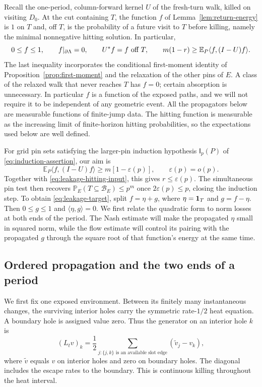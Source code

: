 Recall the one-period, column-forward kernel $U$ of the fresh-turn walk,
killed on visiting $D_0$.  At the cut containing $T$, the function $f$
of Lemma~\ref{lem:return-energy} is $1$ on $T$ and, off $T$, is the
probability of a future visit to $T$ before killing, namely the minimal
nonnegative hitting solution.
In particular,
\begin{equation}\label{eq:leakage-hitting-input}
 0\le f\le1,\qquad f|_{\partial\Lambda}=0,\qquad
 U^*f=f\ \hbox{off }T,\qquad
 m(1-r)\ge\mathbb E_P\langle f,(I-U)f\rangle.
\end{equation}
The last inequality incorporates the conditional first-moment identity
of Proposition~\ref{prop:first-moment} and the relaxation of the other
pins of $E$.  A class of the relaxed walk that never reaches $T$ has
$f=0$; certain absorption is unnecessary.  In particular $f$ is a
function of the exposed paths, and we will not require it to be
independent of any geometric event.
All the propagators below are measurable functions of finite-jump
data.  The hitting function is measurable as the increasing limit of
finite-horizon hitting probabilities, so the expectations used below
are well defined.

For grid pin sets satisfying the larger-pin induction hypothesis
$\mathsf I_p(P)$ of \eqref{eq:induction-assertion}, our aim is
\begin{equation}\label{eq:leakage-target}
 \mathbb E_P\langle f,(I-U)f\rangle\ge m[1-\varepsilon(p)],
 \qquad \varepsilon(p)=o(p).
\end{equation}
Together with \eqref{eq:leakage-hitting-input}, this gives
$r\le\varepsilon(p)$.  The simultaneous pin test then recovers
$\mathbb P_E(T\subseteq\mathcal B_E)\le p^m$ once
$2\varepsilon(p)\le p$, closing the induction step.
To obtain \eqref{eq:leakage-target}, split
$f=\eta+g$, where $\eta=\mathbf 1_T$ and $g=f-\eta$.
Then $0\le g\le1$ and $\langle\eta,g\rangle=0$.
We first relate the quadratic form to norm losses at both ends of the
period.  The Nash estimate will make the propagated $\eta$ small in
squared norm, while the flow estimate will control its pairing with the
propagated $g$ through the square root of that function's energy at the
same time.

\subsection{Ordered propagation and the two ends of a period}

We first fix one exposed environment.  Between its finitely many
instantaneous changes, the surviving interior holes carry the symmetric
rate-$1/2$ heat equation.  A boundary hole is assigned value zero.  Thus
the generator on an interior hole $k$ is
\begin{equation}\label{eq:leakage-generator}
 (L_t v)_k=\frac12\sum_{j:\{j,k\}\text{ is an available slot edge}}
                   (\widetilde v_j-v_k),
\end{equation}
where $\widetilde v$ equals $v$ on interior holes and zero on boundary
holes.  The diagonal includes the escape rates to the boundary.  This
is continuous killing throughout the heat interval.

